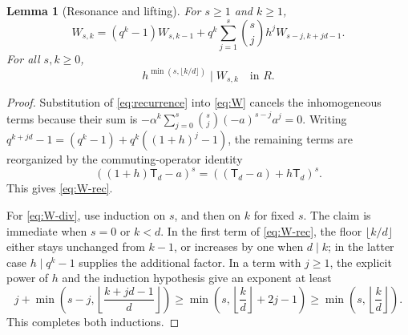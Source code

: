 \documentclass[11pt]{article}
\numberwithin{equation}{section}
\newtheorem{lemma}[lemma]{Lemma}
\theoremstyle{definition}
\theoremstyle{remark}
\newcommand{\fl}[1]{\left\lfloor#1\right\rfloor}
\begin{document}
\begin{lemma}[Resonance and lifting]\label{lem:lifting}
For $s\ge1$ and $k\ge1$,
\begin{equation}\label{eq:W-rec}
 W_{s,k}=(q^k-1)W_{s,k-1}
 +q^k\sum_{j=1}^{s}\binom sj h^jW_{s-j,k+jd-1}.
\end{equation}
For all $s,k\ge0$,
\begin{equation}\label{eq:W-div}
 h^{\min(s,\lfloor k/d\rfloor)}\mid W_{s,k}\quad\text{in }R.
\end{equation}
\end{lemma}
\begin{proof}
Substitution of \eqref{eq:recurrence} into \eqref{eq:W} cancels the
inhomogeneous terms because their sum is
$-\alpha^k\sum_{j=0}^s\binom sj(-a)^{s-j}a^j=0$.
Writing $q^{k+jd}-1=(q^k-1)+q^k((1+h)^j-1)$, the remaining terms
are reorganized by the commuting-operator identity
\[
 ((1+h)\mathsf T_d-a)^s=((\mathsf T_d-a)+h\mathsf T_d)^s.
\]
This gives \eqref{eq:W-rec}.

For \eqref{eq:W-div}, use induction on $s$, and then on $k$ for fixed $s$.
The claim is immediate when $s=0$ or $k<d$. In the first term of
\eqref{eq:W-rec}, the floor $\lfloor k/d\rfloor$ either stays unchanged
from $k-1$, or increases by one when $d\mid k$; in the latter case
$h\mid q^k-1$ supplies the additional factor.
In a term with $j\ge1$, the explicit power of $h$ and the induction
hypothesis give an exponent at least
\[
 j+\min\left(s-j,\fl{\frac{k+jd-1}{d}}\right)
 \ge\min\left(s,\fl{\frac{k}{d}}+2j-1\right)
 \ge\min\left(s,\fl{\frac{k}{d}}\right).
\]
This completes both inductions.
\end{proof}
\end{document}
